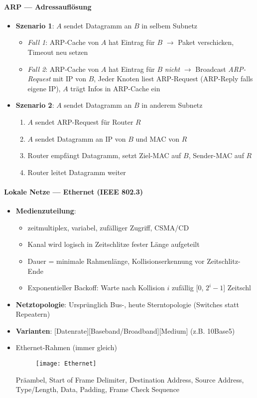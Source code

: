 \paragraph{ARP --- Adressauflösung}
\begin{itemize}
  \item \textbf{Szenario 1}: \( A \) sendet Datagramm an \( B \) in selbem Subnetz
  \begin{itemize}
    \item \emph{Fall 1}: ARP-Cache von \( A \) hat Eintrag für \( B \) \( \to \) Paket verschicken, Timeout neu setzen
    \item \emph{Fall 2}: ARP-Cache von \( A \) hat Eintrag für \( B \) \emph{nicht} \( \to \) Broadcast \emph{ARP-Request} mit IP von \( B \), Jeder Knoten liest ARP-Request (ARP-Reply falls eigene IP), \( A \) trägt Infos in ARP-Cache ein
  \end{itemize}
  \item \textbf{Szenario 2}: \( A \) sendet Datagramm an \( B \) in anderem Subnetz
  \begin{enumerate}
    \item \( A \) sendet ARP-Request für Router \( R \)
    \item \( A \) sendet Datagramm an IP von \( B \) und MAC von \( R \)
    \item Router empfängt Datagramm, setzt Ziel-MAC auf \( B \), Sender-MAC auf \( R \)
    \item Router leitet Datagramm weiter
  \end{enumerate}
\end{itemize}

\paragraph{Lokale Netze --- Ethernet (IEEE 802.3)}
\begin{itemize}
  \item \textbf{Medienzuteilung}:
  \begin{itemize}
    \item zeitmultiplex, variabel, zufälliger Zugriff, CSMA/CD
    \item Kanal wird logisch in Zeitschlitze fester Länge aufgeteilt
    \item Dauer = minimale Rahmenlänge, Kollisionserkennung vor Zeitschlitz-Ende
    \item Exponentieller Backoff: Warte nach Kollision \( i \) zufällig [0, \( 2^i-1 \)] Zeitschl
  \end{itemize}
  \item \textbf{Netztopologie}: Ursprünglich Bus-, heute Sterntopologie (Switches statt Repeatern)
  \item \textbf{Varianten}: [Datenrate][Baseband/Broadband][Medium] (z.B. 10Base5)
   \item Ethernet-Rahmen (immer gleich)
   \begin{figure}[H]\centering\texttt{[image: Ethernet]}\end{figure}
   Präambel, Start of Frame Delimiter, Destination Address, Source Address, Type/Length, Data, Padding, Frame Check Sequence
\end{itemize}

